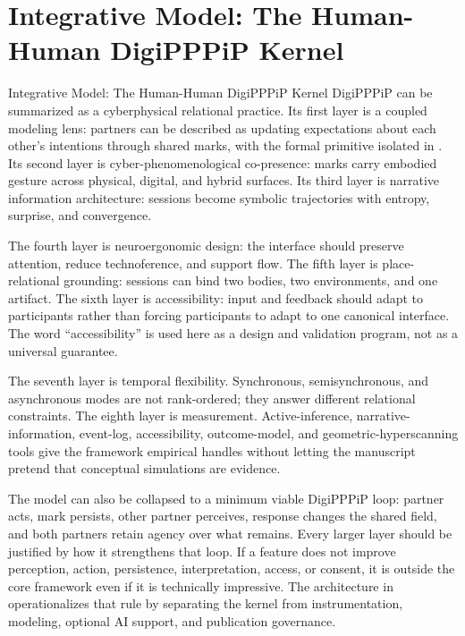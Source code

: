 \documentclass[
  ignorenonframetext,
]{beamer}
\author{\texorpdfstring{}{}}
\date{}
\begin{document}
\section{Integrative Model: The Human-Human DigiPPPiP
Kernel}\label{sec:integrative}

\begin{frame}{Integrative Model: The
Human-Human DigiPPPiP Kernel}
DigiPPPiP can be summarized as a cyberphysical relational practice. Its
first layer is a coupled modeling lens: partners can be described as
updating expectations about each other's intentions through shared
marks, with the formal primitive isolated in
. Its second layer is
cyber-phenomenological co-presence: marks carry embodied gesture across
physical, digital, and hybrid surfaces. Its third layer is narrative
information architecture: sessions become symbolic trajectories with
entropy, surprise, and convergence.

The fourth layer is neuroergonomic design: the interface should preserve
attention, reduce technoference, and support flow. The fifth layer is
place-relational grounding: sessions can bind two bodies, two
environments, and one artifact. The sixth layer is accessibility: input
and feedback should adapt to participants rather than forcing
participants to adapt to one canonical interface. The word
``accessibility'' is used here as a design and validation program, not
as a universal guarantee.

The seventh layer is temporal flexibility. Synchronous, semisynchronous,
and asynchronous modes are not rank-ordered; they answer different
relational constraints. The eighth layer is measurement.
Active-inference, narrative-information, event-log, accessibility,
outcome-model, and geometric-hyperscanning tools give the framework
empirical handles without letting the manuscript pretend that conceptual
simulations are evidence.

The model can also be collapsed to a minimum viable DigiPPPiP loop:
partner acts, mark persists, other partner perceives, response changes
the shared field, and both partners retain agency over what remains.
Every larger layer should be justified by how it strengthens that loop.
If a feature does not improve perception, action, persistence,
interpretation, access, or consent, it is outside the core framework
even if it is technically impressive. The architecture in
 operationalizes that rule by separating
the kernel from instrumentation, modeling, optional AI support, and
publication governance.


\end{frame}
\end{document}
